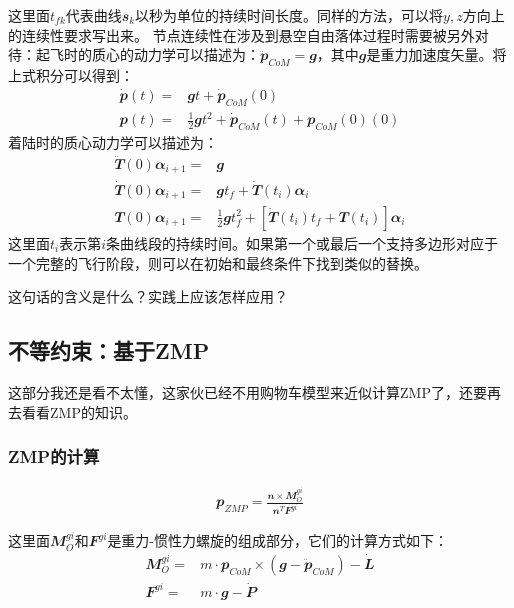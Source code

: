 这里面$t_{fk}$代表曲线${\mathbfit s}_k$以秒为单位的持续时间长度。同样的方法，可以将$y,z$方向上的连续性要求写出来。
节点连续性在涉及到悬空自由落体过程时需要被另外对待：起飞时的质心的动力学可以描述为：$\ddot{\mathbfit p}_{CoM} = {\mathbfit g}$，其中${\mathbfit g}$是重力加速度矢量。将上式积分可以得到：
\begin{align}
    \dot {\mathbfit p}(t) =& {\mathbfit g}t + \dot {\mathbfit p}_{CoM}(0) \\
    {\mathbfit p}(t) =& \frac{1}{2}{\mathbfit g}t^2 + \dot {\mathbfit p}_{CoM}(t)+{\mathbfit p}_{CoM}(0)(0) 
\end{align}
着陆时的质心动力学可以描述为：
\begin{align}
    \ddot {\mathbfit T}(0){\mathbfit \alpha}_{i+1} =& {\mathbfit g}\\
    \dot {\mathbfit T}(0){\mathbfit \alpha}_{i+1} =& {\mathbfit g}t_f + \dot {\mathbfit T}(t_i){\mathbfit \alpha}_{i} \\
    {\mathbfit T}(0){\mathbfit \alpha}_{i+1} =& \frac{1}{2}{\mathbfit g}t_f^2+ [\dot {\mathbfit T}(t_i)t_f+{\mathbfit T}(t_i)]{\mathbfit \alpha}_{i}
\end{align}
这里面$t_i$表示第$i$条曲线段的持续时间。如果第一个或最后一个支持多边形对应于一个完整的飞行阶段，则可以在初始和最终条件下找到类似的替换。
\begin{note}
    这句话的含义是什么？实践上应该怎样应用？
\end{note}

\subsection{不等约束：基于ZMP}
\begin{note}
    这部分我还是看不太懂，这家伙已经不用购物车模型来近似计算ZMP了，还要再去看看ZMP的知识。
\end{note}

\subsubsection{ZMP的计算}
\begin{align}
    {\mathbfit p}_{ZMP} = \frac{{\mathbfit n}\times {\mathbfit M}_O^{gi}}{{\mathbfit n}^T {\mathbfit F}^{gi}}
\end{align}

这里面${\mathbfit M}_O^{gi}$和${\mathbfit F}^{gi}$是重力-惯性力螺旋的组成部分，它们的计算方式如下：
\begin{align}
    {\mathbfit M}_O^{gi} = & m\cdot {\mathbfit p}_{CoM}\times ({\mathbfit g}-\ddot{\mathbfit p}_{CoM})-\dot{\mathbfit L} \\
    {\mathbfit F}^{gi} = & m\cdot{\mathbfit g} - \dot{\mathbfit P}
\end{align}

